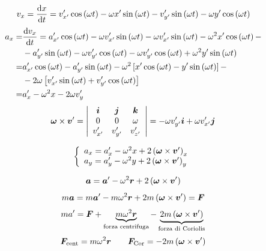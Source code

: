 \begin{equation*}v_x=\frac{\mathrm{d} x}{\mathrm{d} t}=v'_{x'}\cos\left(\omega t\right)-\omega x'\sin\left(\omega t\right)-v'_{y'}\sin\left(\omega t\right)-\omega y'\cos\left(\omega t\right)\end{equation*}
\begin{align*}
a_x=&\frac{\mathrm{d} v_x}{\mathrm{d} t}=a'_{x'}\cos\left(\omega t\right)-\omega v'_{x'}\sin\left(\omega t\right)-\omega v'_{x'}\sin\left(\omega t\right)-\omega^2 x'\cos\left(\omega t\right)-\\
&-a'_{y'}\sin\left(\omega t\right)-\omega v'_{y'}\cos\left(\omega t\right)-\omega v'_{y'}\cos\left(\omega t\right)+\omega^2 y'\sin\left(\omega t\right)\\
=&a'_{x'}\cos\left(\omega t\right)-a'_{y'}\sin\left(\omega t\right)-\omega^2\left[x'\cos\left(\omega t\right)-y'\sin\left(\omega t\right)\right]-\\
&-2\omega\left[v'_{x'}\sin\left(\omega t\right)+v'_{y'}\cos\left(\omega t\right)\right]\\
=&a'_{x}-\omega^2 x-2\omega v'_{y}
\end{align*}
$$\boldsymbol{\omega}\times\boldsymbol{v}'=\left|\begin{array}{ccc}
\boldsymbol{i}&\boldsymbol{j}&\boldsymbol{k}\\
0&0&\omega\\
v'_{x'}&v'_{y'}&v'_{z'}\\
\end{array}
\right|
=-\omega v'_{y'}\boldsymbol{i}+\omega v'_{x'}\boldsymbol{j}$$

$$\left\{\begin{array}{l}
a_x=a'_x-\omega^2 x+2\left(\boldsymbol{\omega}\times\boldsymbol{v}'\right)_x\\
a_y=a'_y-\omega^2 y+2\left(\boldsymbol{\omega}\times\boldsymbol{v}'\right)_y\\
\end{array}\right.$$

\begin{equation*}\boldsymbol{a}=\boldsymbol{a}'-\omega^2 \boldsymbol{r}+2\left(\boldsymbol{\omega}\times\boldsymbol{v}'\right)\end{equation*}
\begin{equation*}m\boldsymbol{a}=m\boldsymbol{a}'-m\omega^2\boldsymbol{r}+2m\left(\boldsymbol{\omega}\times\boldsymbol{v}'\right)=\boldsymbol{F}\end{equation*}
\begin{equation*}ma'=\boldsymbol{F}+\underbrace{m\omega^2\boldsymbol{r}}_\text{forza centrifuga}-\underbrace{2m\left(\boldsymbol{\omega}\times\boldsymbol{v}'\right)}_\text{forza di Coriolis}\end{equation*}
\begin{equation*}\boldsymbol{F}_\text{cent}=m\omega^2 \boldsymbol{r}\qquad \boldsymbol{F}_\text{Cor}=-2m\left(\boldsymbol{\omega}\times\boldsymbol{v}'\right)\end{equation*}

